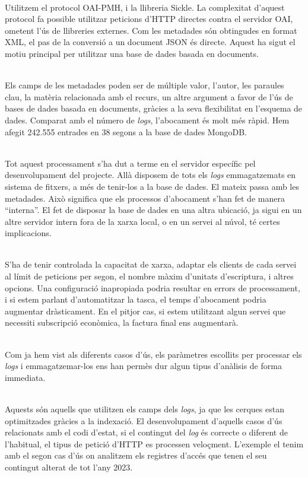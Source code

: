 \noindent \\
Utilitzem el protocol OAI-PMH, i la llibreria Sickle.
La complexitat d'aquest protocol fa possible utilitzar peticions d'\gls{HTTP} directes contra el servidor OAI, ometent l'ús de llibreries externes.
Com les metadades són obtingudes en format XML, el pas de la conversió a un document \gls{JSON} és directe.
Aquest ha sigut el motiu principal per utilitzar una base de dades basada en documents.

\noindent \\
Els camps de les metadades poden ser de múltiple valor, l’autor, les paraules clau, la matèria relacionada amb el recurs, un altre argument a favor de l’ús de bases de dades basada en documents, gràcies a la seva flexibilitat en l’esquema de dades.
Comparat amb el número de \textit{\gls{log}s}, l'abocament és molt més ràpid.
Hem afegit 242.555 entrades en 38 segons a la base de dades MongoDB.

\noindent \\
Tot aquest processament s'ha dut a terme en el servidor específic pel desenvolupament del projecte.
Allà disposem de tots els \textit{\gls{log}s} emmagatzemats en sistema de fitxers, a més de tenir-los a la base de dades.
El mateix passa amb les metadades.
Això significa que els processos d'abocament s'han fet de manera “interna”.
El fet de disposar la base de dades en una altra ubicació, ja sigui en un altre servidor intern fora de la xarxa local, o en un servei al núvol, té certes implicacions.

\noindent \\
S'ha de tenir controlada la capacitat de xarxa, adaptar els clients de cada servei al límit de peticions per segon, el nombre màxim d'unitats d'escriptura, i altres opcions.
Una configuració inapropiada podria resultar en errors de processament, i si estem parlant d'automatitzar la tasca, el temps d'abocament podria augmentar dràsticament.
En el pitjor cas, si estem utilitzant algun servei que necessiti subscripció econòmica, la factura final ens augmentarà.

\noindent \\
Com ja hem vist als diferents casos d'ús, els paràmetres escollits per processar els \textit{\gls{log}s} i emmagatzemar-los ens han permès dur algun tipus d'anàlisis de forma immediata.

\noindent \\
Aquests són aquells que utilitzen els camps dels \textit{\gls{log}s}, ja que les cerques estan optimitzades gràcies a la indexació.
El desenvolupament d'aquells casos d'ús relacionats amb el codi d'estat, si el contingut del \textit{\gls{log}} és correcte o diferent de l'habitual, el tipus de petició d'\gls{HTTP} es processen veloçment.
L'exemple el tenim amb el segon cas d'ús on analitzem els registres d'accés que tenen el seu contingut alterat de tot l'any 2023.

